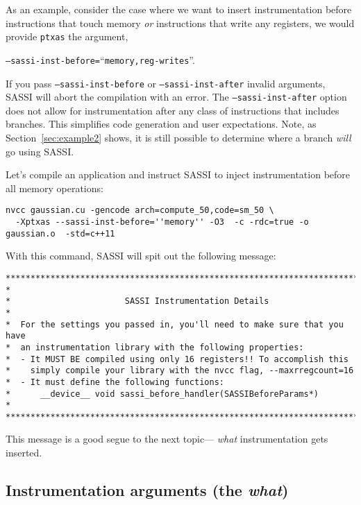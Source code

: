 As an example, consider the case where we want to insert
instrumentation before instructions that touch memory \emph{or}
instructions that write any registers, we would provide \texttt{ptxas}
the argument,\\ 
\begin{center}
\texttt{--sassi-inst-before=}``\texttt{memory,reg-writes}''.
\end{center}

If you pass \texttt{--sassi-inst-before} or
\texttt{--sassi-inst-after} invalid arguments, SASSI will abort the
compilation with an error.  The \texttt{--sassi-inst-after} option
does not allow for instrumentation after any class of instructions
that includes branches.  This simplifies code generation and user
expectations.  Note, as Section~\ref{sec:example2} shows, it is still
possible to determine where a branch \emph{will} go using SASSI.

Let's compile an application and instruct SASSI to inject
instrumentation before all memory operations:

\begin{lstlisting}[style=BashInputStyle]
nvcc gaussian.cu -gencode arch=compute_50,code=sm_50 \
  -Xptxas --sassi-inst-before=''memory'' -O3  -c -rdc=true -o gaussian.o  -std=c++11
\end{lstlisting}

With this command, SASSI will spit out the following message:
\begin{verbatim}
******************************************************************************
*
*                       SASSI Instrumentation Details
*
*  For the settings you passed in, you'll need to make sure that you have
*  an instrumentation library with the following properties:
*  - It MUST BE compiled using only 16 registers!! To accomplish this
*    simply compile your library with the nvcc flag, --maxrregcount=16
*  - It must define the following functions:
*      __device__ void sassi_before_handler(SASSIBeforeParams*)
*
******************************************************************************
\end{verbatim}

This message is a good segue to the next topic--- \emph{what}
instrumentation gets inserted.

\subsection{Instrumentation arguments (the \emph{what})}

